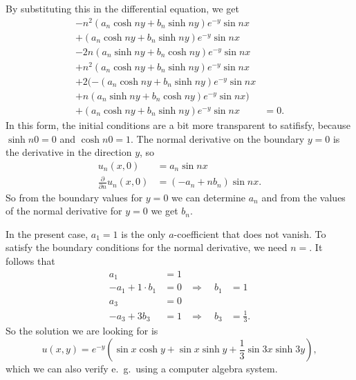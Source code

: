 \begin{loesung}
By substituting this in the differential equation, we get
\begin{align*}
-n^2 (a_n\cosh ny+b_n\sinh ny)e^{-y}\sin nx&\\
+(a_n\cosh ny+b_n\sinh ny)e^{-y}\sin nx&\\
-2n(a_n\sinh ny+b_n\cosh ny)e^{-y}\sin nx&\\
+n^2(a_n\cosh ny+b_n\sinh ny)e^{-y}\sin nx&\\
+2(
-(a_n\cosh ny+b_n\sinh ny)e^{-y}\sin nx&\\
+
n(a_n\sinh ny+b_n\cosh ny)e^{-y}\sin nx
)&\\
+
(a_n\cosh ny+b_n\sinh ny)e^{-y}\sin nx
&=0.
\end{align*}
In this form, the initial conditions are a bit more transparent to
satifisfy, because $\sinh n0=0$ and $\cosh n0=1$.
The normal derivative on the boundary $y=0$ is the derivative in the
direction $y$, so
\begin{align*}
u_n(x,0)&=a_n\sin nx
\\
\frac{\partial}{\partial n}u_n(x,0)&=(-a_n+nb_n)\sin nx.
\end{align*}
So from the boundary values for $y=0$ we can determine $a_n$ and from
the values of the normal derivative for $y=0$ we get $b_n$.

In the present case, $a_1=1$ is the only $a$-coefficient that does
not vanish.
To satisfy the boundary conditions for the normal derivative, we need $n=$.
It follows that
\begin{align*}
a_1&=1&&\\
-a_1+1\cdot b_1&=0&\Rightarrow\quad b_1&=1\\
a_3&=0&&\\
-a_3+3b_3&=1&\Rightarrow\quad b_3&=\frac13.
\end{align*}
So the solution we are looking for is
\[
u(x,y)=e^{-y}(\sin x \cosh y +
\sin x\sinh y
+
\frac13\sin 3x \sinh 3y),
\]
which we can also verify e.~g.~using a computer algebra system.
\end{loesung}


